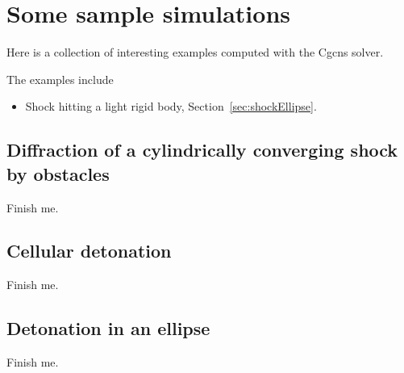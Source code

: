 \section{Some sample simulations} \label{sec:sampleSimulations}

Here is a collection of interesting examples computed with the Cgcns solver.

The examples include
\begin{itemize}
   \item Shock hitting a light rigid body, Section~\ref{sec:shockEllipse}.
\end{itemize}



\subsection{Diffraction of a cylindrically converging shock by obstacles}\label{sec:cylindricalShock}

  Finish me.


\subsection{Cellular detonation}\label{sec:cellularDetonation}

  Finish me.


\subsection{Detonation in an ellipse}\label{sec:detonationEllipse}

  Finish me.

